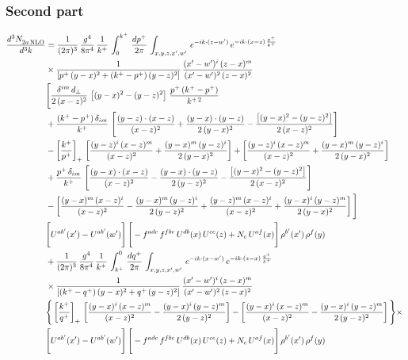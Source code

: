 \documentclass[9pt]{article}
\numberwithin{equation}{section}
\begin{document}
\subsubsection*{Second part}
\begin{align}
    \frac{d^{3}N_{2a\,\rm NLO}^{\rm}}{d^{3}k}  & =  \frac{1}{(2\pi)^{3}}\, \frac{g^{4}}{8\pi^{4}}\,\frac{1}{k^{+}}\,\int_{0}^{k^{+}}\, \frac{dp^{+}}{2\pi}\,\int_{x,y,z,x',w'}\, e^{-ik\cdot(z-w')}\,e^{-ik\cdot (x-z)\,\frac{p^{+}}{k^{+}}}\notag \\ & \times\frac{1}{\left[p^{+}\,(y-x)^{2}+(k^{+}-p^{+})\,(y-z)^{2}\right]}\, \frac{(x'-w')^{i}\,(z-x)^{m}}{(x'-w')^{2}\,(z-x)^{2}} \notag \\ & \Bigg[\frac{\delta^{im}\,d_{\perp}}{2\,(x-z)^{2}}\,\left[(y-x)^{2}-(y-z)^{2}\right]\,\frac{p^{+}\,(k^{+}-p^{+})}{k^{+\,2}}\notag \\ & +\frac{(k^{+}-p^{+})\,\delta_{im}}{k^{+}}\,\left[\frac{(y-z)\cdot (x-z)}{(x-z)^{2}}+\frac{(y-x)\cdot (y-z)}{2\,(y-x)^{2}}-\frac{\left[(y-x)^{2}-(y-z)^{2}\right]}{2\,(x-z)^{2}}\right]\notag \\ & -\left[\frac{k^{+}}{p^{+}}\right]_{+}\,\left[\frac{(y-z)^{i}\,(x-z)^{m}}{(x-z)^{2}}+\frac{(y-x)^{m}\,(y-z)^{i}}{2\,(y-x)^{2}}\right]+ \left[\frac{(y-z)^{i}\,(x-z)^{m}}{(x-z)^{2}}+\frac{(y-x)^{m}\,(y-z)^{i}}{2\,(y-x)^{2}}\right]\notag \\ & +\frac{p^{+}\,\delta_{im}}{k^{+}}\,\left[\frac{(y-x)\cdot (x-z)}{(x-z)^{2}}-\frac{(y-x)\cdot (y-z)}{2\,(y-z)^{2}}-\frac{\left[(y-x)^{2}-(y-z)^{2}\right]}{2\,(x-z)^{2}}\right]\notag \\ &-\left[\frac{(y-x)^{m}\,(x-z)^{i}}{(x-z)^{2}}-\frac{(y-x)^{m}\,(y-z)^{i}}{2\,(y-z)^{2}}+\frac{(y-z)^{m}\,(x-z)^{i}}{(x-z)^{2}}+\frac{(y-x)^{i}\,(y-z)^{m}}{2\,(y-x)^{2}}\right]\Bigg] \notag \\ & \Bigg[U^{ab'}(x')-U^{ab'}(w')\Bigg]\,\Bigg[-f^{adc}\,f^{fbe}\,U^{db}(x)\,U^{ce}(z)+N_{c}\,U^{af}(x)\Bigg]\,\rho^{b'}(x')\,\rho^{f}(y)\notag \\ & + \frac{1}{(2\pi)^{3}}\,\frac{g^{4}}{8\pi^{4}}\,\frac{1}{k^{+}}\, \int^{0}_{k^{+}}\, \frac{dq^{+}}{2\pi} \,  \int_{x,y,z,x',w'}\,e^{-ik\cdot(x-w')}\,e^{-ik\cdot (z-x)\,\frac{q^{+}}{k^{+}}}\notag \\ & \times\frac{1}{\left[(k^{+}-q^{+})\,(y-x)^{2}+q^{+}\,(y-z)^{2}\right]}\, \frac{(x'-w')^{i}\,(z-x)^{m}}{(x'-w')^{2}\,(z-x)^{2}} \notag \\ &\Bigg\{\left[\frac{k^{+}}{q^{+}}\right]_{+}\,\left[\frac{(y-x)^{i}\,(x-z)^{m}}{(x-z)^{2}}-\frac{(y-x)^{i}\,(y-z)^{m}}{2\,(y-z)^{2}}\right] -\left[\frac{(y-x)^{i}\,(x-z)^{m}}{(x-z)^{2}}-\frac{(y-x)^{i}\,(y-z)^{m}}{2\,(y-z)^{2}}\right]\Bigg\}\times\,\notag \\ & \Bigg[U^{ab'}(x')-U^{ab'}(w')\Bigg]\,\Bigg[-f^{adc}\,f^{fbe}\,U^{db}(x)\,U^{ce}(z)+N_{c}\,U^{af}(x)\Bigg]\,\rho^{b'}(x')\,\rho^{f}(y)
\end{align}
\end{document}
